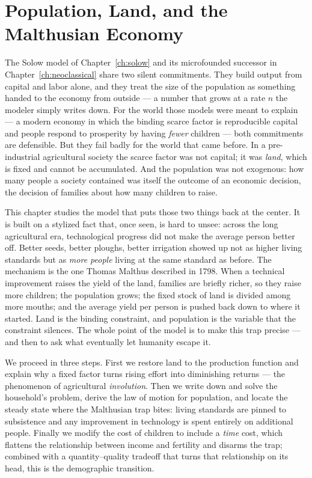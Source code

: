 \chapter{Population, Land, and the Malthusian Economy}
\label{ch:malthus}

The Solow model of Chapter~\ref{ch:solow} and its microfounded successor in Chapter~\ref{ch:neoclassical} share two silent commitments. They build output from capital and labor alone, and they treat the size of the population as something handed to the economy from outside --- a number that grows at a rate $n$ the modeler simply writes down. For the world those models were meant to explain --- a modern economy in which the binding scarce factor is reproducible capital and people respond to prosperity by having \emph{fewer} children --- both commitments are defensible. But they fail badly for the world that came before. In a pre-industrial agricultural society the scarce factor was not capital; it was \emph{land}, which is fixed and cannot be accumulated. And the population was not exogenous: how many people a society contained was itself the outcome of an economic decision, the decision of families about how many children to raise.

This chapter studies the model that puts those two things back at the center. It is built on a stylized fact that, once seen, is hard to unsee: across the long agricultural era, technological progress did not make the average person better off. Better seeds, better ploughs, better irrigation showed up not as higher living standards but as \emph{more people} living at the same standard as before. The mechanism is the one Thomas Malthus described in 1798. When a technical improvement raises the yield of the land, families are briefly richer, so they raise more children; the population grows; the fixed stock of land is divided among more mouths; and the average yield per person is pushed back down to where it started. Land is the binding constraint, and population is the variable that the constraint silences. The whole point of the model is to make this trap precise --- and then to ask what eventually let humanity escape it.

We proceed in three steps. First we restore land to the production function and explain why a fixed factor turns rising effort into diminishing returns --- the phenomenon of agricultural \emph{involution}. Then we write down and solve the household's problem, derive the law of motion for population, and locate the steady state where the Malthusian trap bites: living standards are pinned to subsistence and any improvement in technology is spent entirely on additional people. Finally we modify the cost of children to include a \emph{time} cost, which flattens the relationship between income and fertility and disarms the trap; combined with a quantity--quality tradeoff that turns that relationship on its head, this is the demographic transition.

